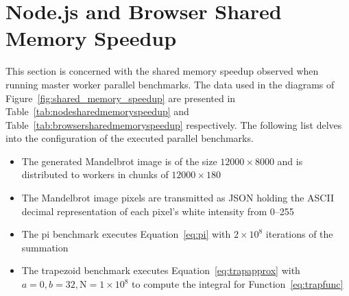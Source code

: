 \documentclass[oneside]{um-fict}
\begin{document}
\section{Node.js and Browser Shared Memory Speedup}
This section is concerned with the shared memory speedup observed when running master worker parallel benchmarks. The data used in the diagrams of Figure~\ref{fig:shared_memory_speedup} are presented in Table~\ref{tab:nodesharedmemoryspeedup} and Table~\ref{tab:browsersharedmemoryspeedup} respectively. The following list delves into the configuration of the executed parallel benchmarks.
\begin{itemize}
\item The generated Mandelbrot image is of the size $12000 \times 8000$ and is distributed to workers in chunks of $12000 \times 180$
\item The Mandelbrot image pixels are transmitted as JSON holding the ASCII decimal representation of each pixel's white intensity from 0--255
\item The pi benchmark executes Equation~\ref{eq:pi} with $2 \times 10^8$ iterations of the summation
\item The trapezoid benchmark executes Equation~\ref{eq:trapapprox} with $a = 0, b = 32, $N$ = 1 \times 10^8$ to compute the integral for Function~\ref{eq:trapfunc}
\end{itemize}
\end{document}
